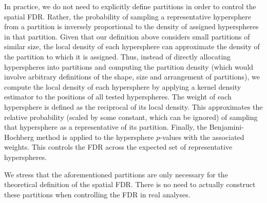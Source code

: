 \documentclass{article}
\begin{document}
In practice, we do not need to explicitly define partitions in order to control the spatial FDR.
Rather, the probability of sampling a representative hypersphere from a partition is inversely proportional to the density of assigned hyperspheres in that partition.
Given that our definition above considers small partitions of similar size, the local density of each hypersphere can approximate the density of the partition to which it is assigned.
Thus, instead of directly allocating hyperspheres into partitions and computing the partition density (which would involve arbitrary definitions of the shape, size and arrangement of partitions), we compute the local density of each hypersphere by applying a kernel density estimator to the positions of all tested hyperspheres.
The weight of each hypersphere is defined as the reciprocal of its local density.
This approximates the relative probability (scaled by some constant, which can be ignored) of sampling that hypersphere as a representative of its partition.
Finally, the Benjamini-Hochberg method is applied to the hypersphere $p$-values with the associated weights.
This controls the FDR across the expected set of representative hyperspheres.


We stress that the aforementioned partitions are only necessary for the theoretical definition of the spatial FDR.
There is no need to actually construct these partitions when controlling the FDR in real analyses.
\end{document}
